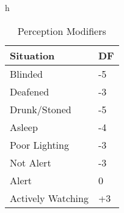 \begin{table}{h}
	\begin{tabular}{ll}
	Situation				&  DF \\ 
	\hline
	Blinded				     &  -5 \\
	Deafened				 &  -3 \\
	Drunk/Stoned			 &  -5 \\
	Asleep					 &  -4 \\
	Poor Lighting			 &  -3 \\
	Not Alert 				 &  -3 \\
	Alert					 &  0  \\
	Actively Watching		 & +3  \\ 
    \end{tabular}
	\caption{Perception Modifiers}\label{Table:PerceptionModifiers}
\end{table}
